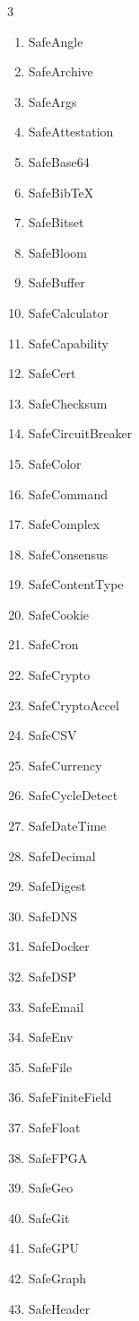 \documentclass[11pt,a4paper]{article}
\begin{document}
\begin{multicols}{3}
\small
\begin{enumerate}[nosep,label=\arabic*.]
\item SafeAngle
\item SafeArchive
\item SafeArgs
\item SafeAttestation
\item SafeBase64
\item SafeBibTeX
\item SafeBitset
\item SafeBloom
\item SafeBuffer
\item SafeCalculator
\item SafeCapability
\item SafeCert
\item SafeChecksum
\item SafeCircuitBreaker
\item SafeColor
\item SafeCommand
\item SafeComplex
\item SafeConsensus
\item SafeContentType
\item SafeCookie
\item SafeCron
\item SafeCrypto
\item SafeCryptoAccel
\item SafeCSV
\item SafeCurrency
\item SafeCycleDetect
\item SafeDateTime
\item SafeDecimal
\item SafeDigest
\item SafeDNS
\item SafeDocker
\item SafeDSP
\item SafeEmail
\item SafeEnv
\item SafeFile
\item SafeFiniteField
\item SafeFloat
\item SafeFPGA
\item SafeGeo
\item SafeGit
\item SafeGPU
\item SafeGraph
\item SafeHeader

\end{enumerate}
\end{multicols}
\end{document}
